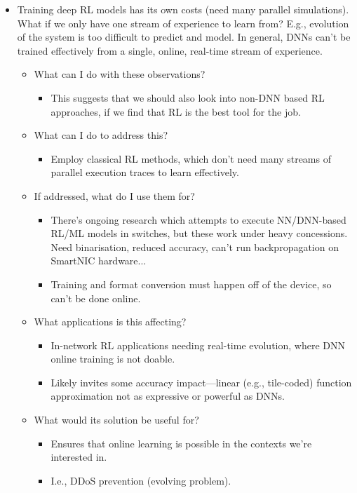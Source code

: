 \documentclass[sigconf,natbib=false]{acmart}
\begin{document}
\begin{itemize}
	\item Training deep RL models has its own costs (need many parallel simulations). What if we only have one stream of experience to learn from? E.g., evolution of the system is too difficult to predict and model. In general, DNNs can't be trained effectively from a single, online, real-time stream of experience.
	\begin{itemize}
		\item What can I do with these observations?
		\begin{itemize}
			\item This suggests that we should also look into non-DNN based RL approaches, if we find that RL is the best tool for the job.
		\end{itemize}
		\item What can I do to address this?
		\begin{itemize}
			\item Employ classical RL methods, which don't need many streams of parallel execution traces to learn effectively.
		\end{itemize}
		\item If addressed, what do I use them for?
		\begin{itemize}
			\item There's ongoing research which attempts to execute NN/DNN-based RL/ML models in switches, but these work under heavy concessions. Need binarisation, reduced accuracy, can't run backpropagation on SmartNIC hardware...
			\item Training and format conversion must happen off of the device, so can't be done online.
		\end{itemize}
		\item What applications is this affecting?
		\begin{itemize}
			\item In-network RL applications needing real-time evolution, where DNN online training is not doable.
			\item Likely invites some accuracy impact---linear (e.g., tile-coded) function approximation not as expressive or powerful as DNNs.
		\end{itemize}
		\item What would its solution be useful for?
		\begin{itemize}
			\item Ensures that online learning is possible in the contexts we're interested in.
			\item I.e., DDoS prevention (evolving problem).
		\end{itemize}
	\end{itemize}
	

\end{itemize}
\end{document}
